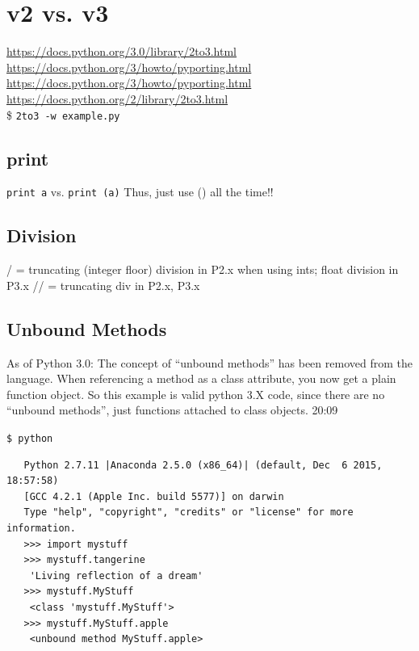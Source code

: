 \documentclass[11pt,a4paper]{article}
\begin{document}
\newpage
\section{v2 vs. v3}
\href{https://docs.python.org/3.0/library/2to3.html}{https://docs.python.org/3.0/library/2to3.html}\\
\href{https://docs.python.org/3/howto/pyporting.html}{https://docs.python.org/3/howto/pyporting.html}\\
\href{https://docs.python.org/3/howto/pyporting.html}{https://docs.python.org/3/howto/pyporting.html}
\href{https://docs.python.org/2/library/2to3.html}{https://docs.python.org/2/library/2to3.html}\\
\$ {\tt 2to3 -w example.py}\\


    \subsection{print}
    {\tt print a} vs. {\tt print (a)}
    Thus, just use () all the time!!
    
    \subsection{Division}
    / = truncating (integer floor) division in P2.x when using ints; float division in P3.x
    // = truncating div in P2.x, P3.x 
    

     \subsection{Unbound Methods}
     As of Python 3.0: The concept of ``unbound methods'' has been
removed from the language. When referencing a method as a class
attribute, you now get a plain function object. So this example is
valid python 3.X code, since there are no ``unbound methods'', just
functions attached to class objects.  %
20:09

     {\tt \$ python}
    \begin{lstlisting}
   Python 2.7.11 |Anaconda 2.5.0 (x86_64)| (default, Dec  6 2015, 18:57:58) 
   [GCC 4.2.1 (Apple Inc. build 5577)] on darwin
   Type "help", "copyright", "credits" or "license" for more information.
   >>> import mystuff
   >>> mystuff.tangerine
    'Living reflection of a dream'
   >>> mystuff.MyStuff
    <class 'mystuff.MyStuff'>
   >>> mystuff.MyStuff.apple
    <unbound method MyStuff.apple>
     \end{lstlisting}
\end{document}
